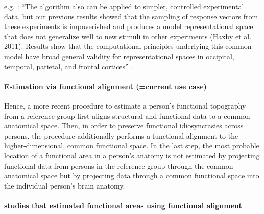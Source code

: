 
e.g. \citet{guntupalli2016model}: ``The algorithm also can be applied to
simpler, controlled experimental data, but our previous results showed that the
sampling of response vectors from these experiments is impoverished and produces
a model representational space that does not generalize well to new stimuli in
other experiments (Haxby et al.  2011). Results show that the computational
principles underlying this common model have broad general validity for
representational spaces in occipital, temporal, parietal, and frontal cortices''
\citep{guntupalli2016model}.


\paragraph{Estimation via functional alignment (=current use case)}


%
Hence, a more recent procedure to estimate a person's functional topography from
a reference group first aligns structural and functional data to a common
anatomical space. Then, in order to preserve functional idiosyncrasies across
persons, the procedure additionally performs a functional alignment to
the higher-dimensional, common functional space.
In the last step, the most probable location of a functional area in a person's
anatomy is not estimated by projecting functional data from persons in the
reference group through the common anatomical space but by projecting data
through a common functional space into the individual person's brain anatomy.


\paragraph{studies that estimated functional areas using functional alignment}



